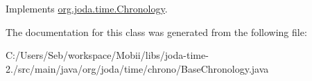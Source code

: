 Implements \hyperlink{classorg_1_1joda_1_1time_1_1_chronology_a7b1adf5c441b0a4da0463f192f2c78ca}{org.\-joda.\-time.\-Chronology}.



The documentation for this class was generated from the following file\-:\begin{DoxyCompactItemize}
\item 
C\-:/\-Users/\-Seb/workspace/\-Mobii/libs/joda-\/time-\/2./src/main/java/org/joda/time/chrono/Base\-Chronology.\-java\end{DoxyCompactItemize}
